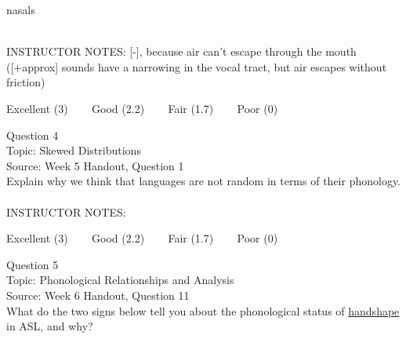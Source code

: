 \documentclass[12pt]{article}
\begin{document}
nasals


~\\
INSTRUCTOR NOTES: [-], because air can't escape through the mouth ([+approx] sounds have a narrowing in the vocal tract, but air escapes without friction)


\vfill
Excellent (3) ~~~ Good (2.2) ~~~ Fair (1.7) ~~~ Poor (0)
\newpage

{\large Question 4}\\

Topic: Skewed Distributions\\
Source: Week 5 Handout, Question 1\\

Explain why we think that languages are not random in terms of their phonology.\\


~\\
INSTRUCTOR NOTES: 


\vfill
Excellent (3) ~~~ Good (2.2) ~~~ Fair (1.7) ~~~ Poor (0)
\newpage

{\large Question 5}\\

Topic: Phonological Relationships and Analysis\\
Source: Week 6 Handout, Question 11\\

What do the two signs below tell you about the phonological status of \underline{handshape} in ASL, and why?\\
\end{document}
